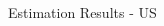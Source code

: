\documentclass[final]{beamer}
\begin{document}
\begin{frame}
\begin{columns}[t]
\begin{column}{.53 \linewidth}
\begin{columns}[c]
\begin{column}{.48 \linewidth}
\begin{block}{Estimation Results - US}

\end{block}
\end{column}
\end{columns}
\end{column}
\end{columns}
\end{frame}
\end{document}
